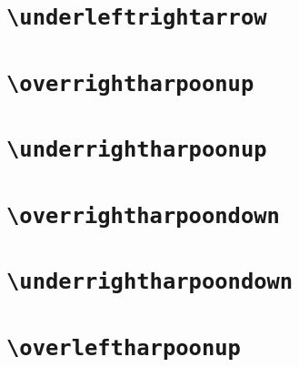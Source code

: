 \documentclass[12pt]{article}
\begin{document}
\begin{dispExample}
  \TestOverArrow{\overleftrightarrow}
\end{dispExample}

\section{\texttt{\textbackslash underleftrightarrow}}

\begin{dispExample}
  \TestOverArrow{\underleftrightarrow}
\end{dispExample}

\section{\texttt{\textbackslash overrightharpoonup}}

\begin{dispExample}
  \TestOverArrow{\overrightharpoonup}
\end{dispExample}

\section{\texttt{\textbackslash underrightharpoonup}}

\begin{dispExample}
  \TestOverArrow{\underrightharpoonup}
\end{dispExample}

\section{\texttt{\textbackslash overrightharpoondown}}

\begin{dispExample}
  \TestOverArrow{\overrightharpoondown}
\end{dispExample}

\section{\texttt{\textbackslash underrightharpoondown}}

\begin{dispExample}
  \TestOverArrow{\underrightharpoondown}
\end{dispExample}

\section{\texttt{\textbackslash overleftharpoonup}}
\end{document}
